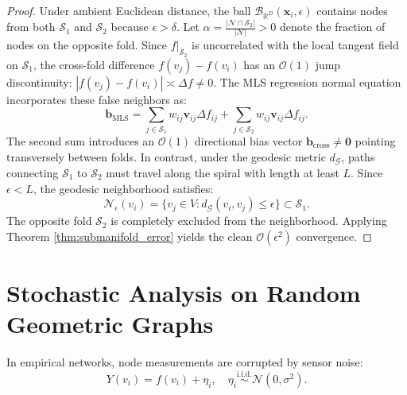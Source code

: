\documentclass[11pt,a4paper]{article}
\theoremstyle{definition}
\begin{document}
\begin{proof}
Under ambient Euclidean distance, the ball $\mathcal{B}_{\mathbb{R}^D}(\mathbf{x}_i, \epsilon)$ contains nodes from both $\mathcal{S}_1$ and $\mathcal{S}_2$ because $\epsilon > \delta$. 
Let $\alpha = \frac{|\mathcal{N} \cap \mathcal{S}_2|}{|\mathcal{N}|} > 0$ denote the fraction of nodes on the opposite fold. 
Since $f|_{\mathcal{S}_2}$ is uncorrelated with the local tangent field on $\mathcal{S}_1$, the cross-fold difference $f(v_j) - f(v_i)$ has an $\mathcal{O}(1)$ jump discontinuity: $|f(v_j) - f(v_i)| \asymp \Delta f \neq 0$.
The MLS regression normal equation incorporates these false neighbors as:
\begin{equation}
\mathbf{b}_{\text{MLS}} = \sum_{j \in \mathcal{S}_1} w_{ij} \mathbf{v}_{ij} \Delta f_{ij} + \sum_{j \in \mathcal{S}_2} w_{ij} \mathbf{v}_{ij} \Delta f_{ij}.
\end{equation}
The second sum introduces an $\mathcal{O}(1)$ directional bias vector $\mathbf{b}_{\text{cross}} \neq \mathbf{0}$ pointing transversely between folds.
In contrast, under the geodesic metric $d_{\mathcal{G}}$, paths connecting $\mathcal{S}_1$ to $\mathcal{S}_2$ must travel along the spiral with length at least $L$. Since $\epsilon < L$, the geodesic neighborhood satisfies:
\begin{equation}
\mathcal{N}_\epsilon(v_i) = \{ v_j \in V : d_{\mathcal{G}}(v_i, v_j) \le \epsilon \} \subset \mathcal{S}_1.
\end{equation}
The opposite fold $\mathcal{S}_2$ is completely excluded from the neighborhood. Applying Theorem \ref{thm:submanifold_error} yields the clean $\mathcal{O}(\epsilon^2)$ convergence.
\end{proof}


\section{Stochastic Analysis on Random Geometric Graphs}
\label{sec:stochastic}

In empirical networks, node measurements are corrupted by sensor noise:
\begin{equation}
Y(v_i) = f(v_i) + \eta_i, \quad \eta_i \stackrel{\text{i.i.d.}}{\sim} \mathcal{N}(0, \sigma^2).
\end{equation}
\end{document}
